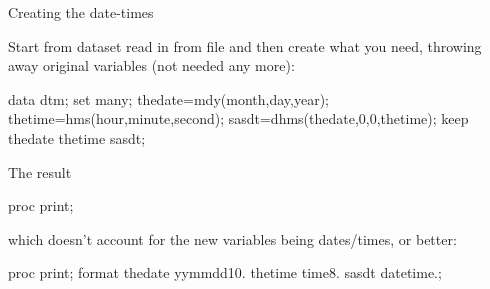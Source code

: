 \documentclass[unknownkeysallowed]{beamer}\usepackage[]{graphicx}\usepackage[]{color}
\begin{document}
\begin{frame}[fragile]{Creating the date-times}
  
  Start from dataset read in from file and then create what you need,
  throwing away original variables (not needed any more):

    \begin{Datastep}
data dtm;
  set many;
  thedate=mdy(month,day,year);
  thetime=hms(hour,minute,second);
  sasdt=dhms(thedate,0,0,thetime); 
  keep thedate thetime sasdt;      
    \end{Datastep}

\end{frame}

\begin{frame}[fragile]{The result}
  
  \begin{Sascode}[store=qa]
proc print;    
  \end{Sascode}
  

which doesn't account for the new variables being dates/times,
or better:

  \begin{Sascode}[store=qab]
proc print;    
format thedate yymmdd10. thetime time8. 
  sasdt datetime.;
  \end{Sascode}
  

  
\end{frame}
\end{document}
